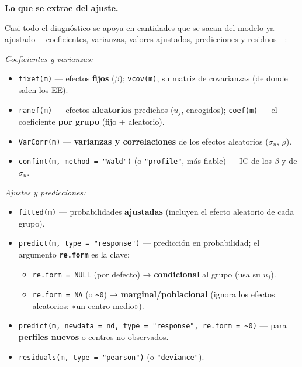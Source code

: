 \documentclass[
  letterpaper,
  DIV=11,
  numbers=noendperiod]{scrartcl}
\providecommand{\tightlist}{%
  \setlength{\itemsep}{0pt}\setlength{\parskip}{0pt}}\usepackage{longtable,booktabs,array}
\begin{document}
\textbf{Lo que se extrae del ajuste.}

Casi todo el diagnóstico se apoya en cantidades que se sacan del modelo
ya ajustado ---coeficientes, varianzas, valores ajustados, predicciones
y residuos---:

\begin{tcolorbox}[enhanced jigsaw, breakable, colframe=quarto-callout-tip-color-frame, left=2mm, arc=.35mm, colbacktitle=quarto-callout-tip-color!10!white, toprule=.15mm, colback=white, coltitle=black, rightrule=.15mm, opacitybacktitle=0.6, title=\textcolor{quarto-callout-tip-color}{\faLightbulb}\hspace{0.5em}{🔧 En R. Extraer de un GLMM ajustado \texttt{m}}, titlerule=0mm, toptitle=1mm, bottomtitle=1mm, leftrule=.75mm, bottomrule=.15mm, opacityback=0]

\emph{Coeficientes y varianzas:}

\begin{itemize}
\tightlist
\item
  \texttt{fixef(m)} --- efectos \textbf{fijos} (\(\beta\));
  \texttt{vcov(m)}, su matriz de covarianzas (de donde salen los EE).
\item
  \texttt{ranef(m)} --- efectos \textbf{aleatorios} predichos (\(u_j\),
  encogidos); \texttt{coef(m)} --- el coeficiente \textbf{por grupo}
  (fijo + aleatorio).
\item
  \texttt{VarCorr(m)} --- \textbf{varianzas y correlaciones} de los
  efectos aleatorios (\(\sigma_u\), \(\rho\)).
\item
  \texttt{confint(m,\ method\ =\ "Wald")} (o \texttt{"profile"}, más
  fiable) --- IC de los \(\beta\) y de \(\sigma_u\).
\end{itemize}

\emph{Ajustes y predicciones:}

\begin{itemize}
\tightlist
\item
  \texttt{fitted(m)} --- probabilidades \textbf{ajustadas} (incluyen el
  efecto aleatorio de cada grupo).
\item
  \texttt{predict(m,\ type\ =\ "response")} --- predicción en
  probabilidad; el argumento \textbf{\texttt{re.form}} es la clave:

  \begin{itemize}
  \tightlist
  \item
    \texttt{re.form\ =\ NULL} (por defecto) → \textbf{condicional} al
    grupo (usa su \(u_j\)).
  \item
    \texttt{re.form\ =\ NA} (o \texttt{\textasciitilde{}0}) →
    \textbf{marginal/poblacional} (ignora los efectos aleatorios: «un
    centro medio»).
  \end{itemize}
\item
  \texttt{predict(m,\ newdata\ =\ nd,\ type\ =\ "response",\ re.form\ =\ \textasciitilde{}0)}
  --- para \textbf{perfiles nuevos} o centros no observados.
\item
  \texttt{residuals(m,\ type\ =\ "pearson")} (o \texttt{"deviance"}).
\end{itemize}


\end{tcolorbox}
\end{document}
